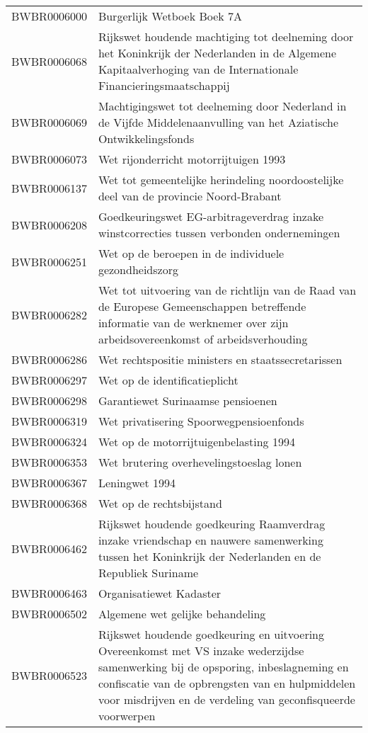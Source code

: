 \begin{longtable}{lp{}}
BWBR0006000 & Burgerlijk Wetboek Boek 7A \\
BWBR0006068 & Rijkswet houdende machtiging tot deelneming door het Koninkrijk der Nederlanden in de Algemene Kapitaalverhoging van de Internationale Financieringsmaatschappij \\
BWBR0006069 & Machtigingswet tot deelneming door Nederland in de Vijfde Middelenaanvulling van het Aziatische Ontwikkelingsfonds \\
BWBR0006073 & Wet rijonderricht motorrijtuigen 1993  \\
BWBR0006137 & Wet tot gemeentelijke herindeling noordoostelijke deel van de provincie Noord-Brabant \\
BWBR0006208 & Goedkeuringswet EG-arbitrageverdrag inzake winstcorrecties tussen verbonden ondernemingen \\
BWBR0006251 & Wet op de beroepen in de individuele gezondheidszorg \\
BWBR0006282 & Wet tot uitvoering van de richtlijn van de Raad van de Europese Gemeenschappen betreffende informatie van de werknemer over zijn arbeidsovereenkomst of arbeidsverhouding \\
BWBR0006286 & Wet rechtspositie ministers en staatssecretarissen \\
BWBR0006297 & Wet op de identificatieplicht \\
BWBR0006298 & Garantiewet Surinaamse pensioenen \\
BWBR0006319 & Wet privatisering Spoorwegpensioenfonds \\
BWBR0006324 & Wet op de motorrijtuigenbelasting 1994 \\
BWBR0006353 & Wet brutering overhevelingstoeslag lonen \\
BWBR0006367 & Leningwet 1994 \\
BWBR0006368 & Wet op de rechtsbijstand \\
BWBR0006462 & Rijkswet houdende goedkeuring Raamverdrag inzake vriendschap en nauwere samenwerking tussen het Koninkrijk der Nederlanden en de Republiek Suriname \\
BWBR0006463 & Organisatiewet Kadaster \\
BWBR0006502 & Algemene wet gelijke behandeling  \\
BWBR0006523 & Rijkswet houdende goedkeuring en uitvoering Overeenkomst met VS inzake wederzijdse samenwerking bij de opsporing, inbeslagneming en confiscatie van de opbrengsten van en hulpmiddelen voor misdrijven en de verdeling van geconfisqueerde voorwerpen \\

\end{longtable}
